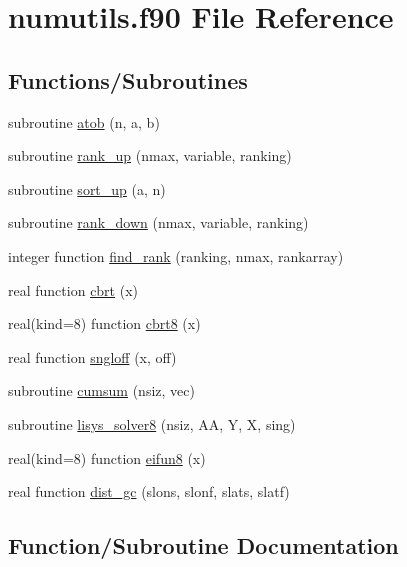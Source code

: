 \hypertarget{numutils_8f90}{}\section{numutils.\+f90 File Reference}
\label{numutils_8f90}
\subsection*{Functions/\+Subroutines}
\begin{DoxyCompactItemize}
\item 
subroutine \hyperlink{numutils_8f90_ad99541497f02a7efb987c5b45e675857}{atob} (n, a, b)
\item 
subroutine \hyperlink{numutils_8f90_a0084ebfe86806971df228c1a4ef3ffbf}{rank\+\_\+up} (nmax, variable, ranking)
\item 
subroutine \hyperlink{numutils_8f90_a0ce70697995bdbb28ca0f7de92ba5210}{sort\+\_\+up} (a, n)
\item 
subroutine \hyperlink{numutils_8f90_ad368a70da00278adffefa8d34a5f87c6}{rank\+\_\+down} (nmax, variable, ranking)
\item 
integer function \hyperlink{numutils_8f90_a732ad4008d82d16d53c093bf1cecccc3}{find\+\_\+rank} (ranking, nmax, rankarray)
\item 
real function \hyperlink{numutils_8f90_abee471b10b1564285b25aa1b7b6f1577}{cbrt} (x)
\item 
real(kind=8) function \hyperlink{numutils_8f90_ad4b910be4531c088be1d1e83197aa36e}{cbrt8} (x)
\item 
real function \hyperlink{numutils_8f90_a97ff3973394dba1b9534e055e358de97}{sngloff} (x, off)
\item 
subroutine \hyperlink{numutils_8f90_a4c6620f6e7e0c517c0680ce839de1a3e}{cumsum} (nsiz, vec)
\item 
subroutine \hyperlink{numutils_8f90_a4a474fb2edbafe34d84319dd1ffe33b3}{lisys\+\_\+solver8} (nsiz, AA, Y, X, sing)
\item 
real(kind=8) function \hyperlink{numutils_8f90_a87009269fa8aecf49be15f20599f3052}{eifun8} (x)
\item 
real function \hyperlink{numutils_8f90_abff00715b3227e38afe4c1a67416e4d2}{dist\+\_\+gc} (slons, slonf, slats, slatf)
\end{DoxyCompactItemize}


\subsection{Function/\+Subroutine Documentation}
\mbox{\label{numutils_8f90_ad99541497f02a7efb987c5b45e675857}} 
